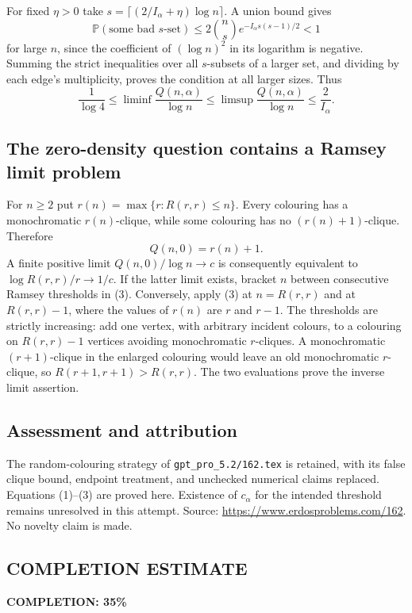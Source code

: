 For fixed $\eta>0$ take $s=\lceil(2/I_\alpha+\eta)\log n\rceil$. A union bound gives
\[
 \mathbb P(\text{some bad $s$-set})
 \le2\binom ns e^{-I_\alpha s(s-1)/2}<1
\]
for large $n$, since the coefficient of $(\log n)^2$ in its logarithm is negative. Summing the strict inequalities over all $s$-subsets of a larger set, and dividing by each edge's multiplicity, proves the condition at all larger sizes. Thus
\[
 \frac1{\log4}\le\liminf\frac{Q(n,\alpha)}{\log n}
 \le\limsup\frac{Q(n,\alpha)}{\log n}\le\frac2{I_\alpha}.
 \tag{2}
\]

\subsection*{The zero-density question contains a Ramsey limit problem}
For $n\ge2$ put $r(n)=\max\{r:R(r,r)\le n\}$. Every colouring has a monochromatic $r(n)$-clique, while some colouring has no $(r(n)+1)$-clique. Therefore
\[
 Q(n,0)=r(n)+1. \tag{3}
\]
A finite positive limit $Q(n,0)/\log n\to c$ is consequently equivalent to
$\log R(r,r)/r\to1/c$. If the latter limit exists, bracket $n$ between consecutive Ramsey thresholds in (3). Conversely, apply (3) at $n=R(r,r)$ and at $R(r,r)-1$, where the values of $r(n)$ are $r$ and $r-1$. The thresholds are strictly increasing: add one vertex, with arbitrary incident colours, to a colouring on $R(r,r)-1$ vertices avoiding monochromatic $r$-cliques. A monochromatic $(r+1)$-clique in the enlarged colouring would leave an old monochromatic $r$-clique, so $R(r+1,r+1)>R(r,r)$. The two evaluations prove the inverse limit assertion.

\subsection*{Assessment and attribution}
The random-colouring strategy of \texttt{gpt\_pro\_5.2/162.tex} is retained, with its false clique bound, endpoint treatment, and unchecked numerical claims replaced. Equations (1)--(3) are proved here. Existence of $c_\alpha$ for the intended threshold remains unresolved in this attempt. Source: \url{https://www.erdosproblems.com/162}. No novelty claim is made.
\subsection*{COMPLETION ESTIMATE}
\textbf{COMPLETION: 35\%}
